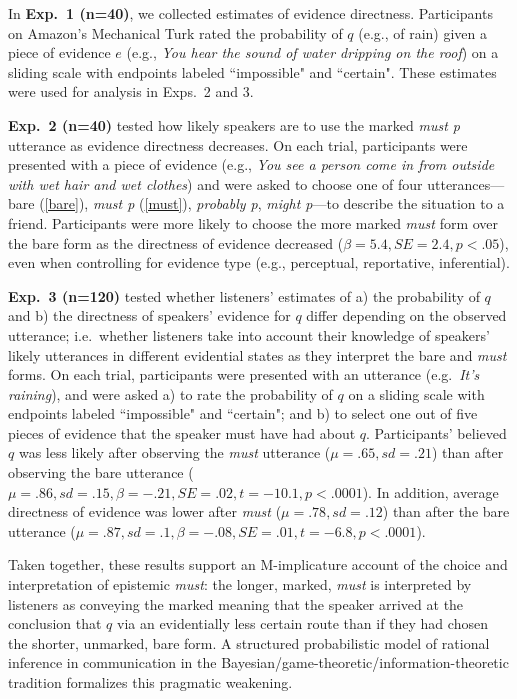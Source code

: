 \documentclass[11pt]{article}
\begin{document}
In \textbf{Exp.~1 (n=40)}, we collected estimates of evidence directness. Participants on Amazon's Mechanical Turk rated the probability of $q$ (e.g., of rain) given a piece of evidence $e$ (e.g., \textit{You hear the sound of water dripping on the roof}) on a sliding scale with endpoints labeled ``impossible" and ``certain". These estimates were used for analysis in Exps.~2 and 3.

\textbf{Exp.~2 (n=40)} tested how likely speakers are to use the marked \emph{must p} utterance as evidence directness decreases. On each trial, participants were presented with a piece of evidence (e.g., \textit{You see a person come in from outside with wet hair and wet clothes}) and were asked to choose one of four utterances---bare (\ref{bare}), \textit{must p} (\ref{must}), \textit{probably p}, \textit{might p}---to describe the situation to a friend. Participants were more likely to choose the more marked \textit{must} form over the bare form as the directness of evidence decreased ($\beta=5.4, SE=2.4, p<.05$), even when controlling for evidence type (e.g., perceptual, reportative, inferential).

\textbf{Exp.~3 (n=120)} tested {whether listeners' estimates of a) the probability of $q$ and b) the directness of speakers' evidence for $q$ differ depending on the observed utterance}; i.e.~whether listeners take into account their knowledge of speakers' likely utterances in different evidential states as they interpret the bare and \textit{must} forms. On each trial, participants were presented with an utterance (e.g.~\textit{It's raining}), and were asked a) to rate the probability of $q$ on a sliding scale with endpoints labeled ``impossible" and ``certain"; and b) to select one out of five pieces of evidence that the speaker must have had about $q$. Participants' believed $q$ was less likely after observing the \textit{must} utterance ($\mu=.65,sd=.21$) than after observing the bare utterance ($\mu=.86,sd=.15, \beta=-.21, SE=.02, t=-10.1, p<.0001$). In addition, average directness of evidence was lower after \textit{must} ($\mu=.78,sd=.12$) than after the bare utterance ($\mu=.87,sd=.1, \beta=-.08, SE=.01, t=-6.8, p<.0001$).

Taken together, these results support an M-implicature account of the choice and interpretation of epistemic \textit{must}: the longer, marked, \textit{must} is interpreted by listeners as conveying the marked meaning that the speaker arrived at the conclusion that $q$ via an evidentially less certain route than if they had chosen the shorter, unmarked, bare form. A structured probabilistic model of rational inference in communication in the Bayesian/game-theoretic/information-theoretic tradition \cite{franke, goodman, levy, jaeger} formalizes this pragmatic weakening.
\end{document}
